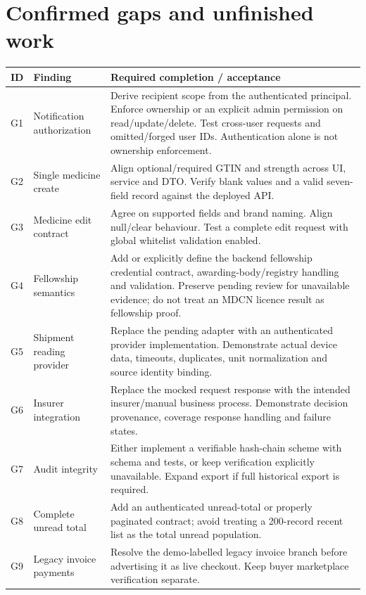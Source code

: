 \documentclass[11pt,a4paper]{article}
\begin{document}
\section{Confirmed gaps and unfinished work}\label{sec:gaps}
\begin{longtable}{L{0.07\textwidth}L{0.24\textwidth}L{0.58\textwidth}}
\toprule \textbf{ID} & \textbf{Finding} & \textbf{Required completion / acceptance}\\
\midrule\endhead
G1 & Notification authorization & Derive recipient scope from the authenticated principal. Enforce ownership or an explicit admin permission on read/update/delete. Test cross-user requests and omitted/forged user IDs. Authentication alone is not ownership enforcement.\\
G2 & Single medicine create & Align optional/required GTIN and strength across UI, service and DTO. Verify blank values and a valid seven-field record against the deployed API.\\
G3 & Medicine edit contract & Agree on supported fields and brand naming. Align null/clear behaviour. Test a complete edit request with global whitelist validation enabled.\\
G4 & Fellowship semantics & Add or explicitly define the backend fellowship credential contract, awarding-body/registry handling and validation. Preserve pending review for unavailable evidence; do not treat an MDCN licence result as fellowship proof.\\
G5 & Shipment reading provider & Replace the pending adapter with an authenticated provider implementation. Demonstrate actual device data, timeouts, duplicates, unit normalization and source identity binding.\\
G6 & Insurer integration & Replace the mocked request response with the intended insurer/manual business process. Demonstrate decision provenance, coverage response handling and failure states.\\
G7 & Audit integrity & Either implement a verifiable hash-chain scheme with schema and tests, or keep verification explicitly unavailable. Expand export if full historical export is required.\\
G8 & Complete unread total & Add an authenticated unread-total or properly paginated contract; avoid treating a 200-record recent list as the total unread population.\\
G9 & Legacy invoice payments & Resolve the demo-labelled legacy invoice branch before advertising it as live checkout. Keep buyer marketplace verification separate.\\

\end{longtable}
\end{document}
